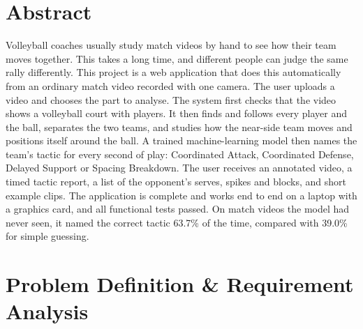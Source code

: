 \documentclass[11pt, a4paper]{article}
\begin{document}
\section{Abstract}
\noindent
Volleyball coaches usually study match videos by hand to see how their team moves together. This takes a long time, and different people can judge the same rally differently. This project is a web application that does this automatically from an ordinary match video recorded with one camera. The user uploads a video and chooses the part to analyse. The system first checks that the video shows a volleyball court with players. It then finds and follows every player and the ball, separates the two teams, and studies how the near-side team moves and positions itself around the ball. A trained machine-learning model then names the team's tactic for every second of play: Coordinated Attack, Coordinated Defense, Delayed Support or Spacing Breakdown. The user receives an annotated video, a timed tactic report, a list of the opponent's serves, spikes and blocks, and short example clips. The application is complete and works end to end on a laptop with a graphics card, and all functional tests passed. On match videos the model had never seen, it named the correct tactic 63.7\% of the time, compared with 39.0\% for simple guessing.

\section{Problem Definition \& Requirement Analysis}
\end{document}
